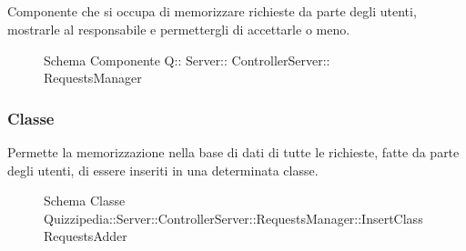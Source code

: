 \subsection{}
Componente che si occupa di memorizzare richieste da parte degli utenti, mostrarle al responsabile e permettergli di accettarle o meno.
\begin{figure}[H]
\centering
\noindent{}
\caption[Schema Componente Quizzipedia::Server::ControllerServer::RequestsManager]{Schema Componente Q:: Server:: ControllerServer:: RequestsManager}
\end{figure}
\subsubsection{Classe }
Permette la memorizzazione nella base di dati di tutte le richieste, fatte da parte degli utenti, di essere inseriti in una determinata classe.
\begin{figure}[H]
\centering
\noindent{}
\caption[Schema Classe InsertClassRequestsAdder]{Schema Classe Quizzipedia::Server::ControllerServer::RequestsManager::InsertClassRequestsAdder}
\end{figure}
